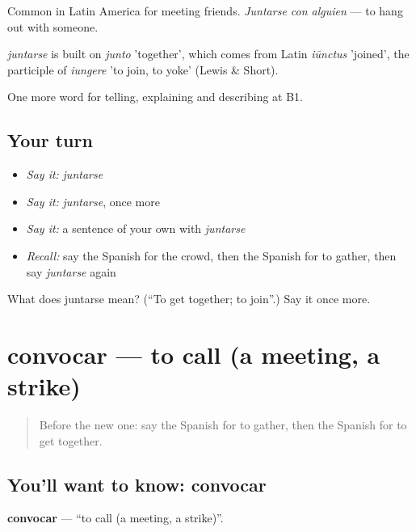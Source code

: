 Common in Latin America for meeting friends. \emph{Juntarse con alguien} — to hang out with someone.

\begin{cousinweb}
\emph{juntarse} is built on \emph{junto} 'together', which comes from Latin \emph{iūnctus} 'joined', the participle of \emph{iungere} 'to join, to yoke' (Lewis \& Short).
\end{cousinweb}

\begin{grammarlens}[title={What you've built}]
One more word for telling, explaining and describing at B1.
\end{grammarlens}

\subsection*{Your turn}
\begin{itemize}
\raggedright
  \item \emph{Say it:} \emph{juntarse}
  \item \emph{Say it:} \emph{juntarse}, once more
  \item \emph{Say it:} a sentence of your own with \emph{juntarse}
  \item \emph{Recall:} say the Spanish for the crowd, then the Spanish for to gather, then say \emph{juntarse} again
\end{itemize}

\begin{tcolorbox}[breakable,colback=teal!4,colframe=teal!35!black,title={Before you move on}]
What does juntarse mean? (\textquotedblleft{}To get together; to join\textquotedblright{}.) Say it once more.
\end{tcolorbox}
\section[convocar]{convocar — to call (a meeting, a strike)}

\label{lesson:ES-C560-convocar}



\begin{quote}
Before the new one: say the Spanish for to gather, then the Spanish for to get together.
\end{quote}

\subsection*{You'll want to know: convocar}
\textbf{convocar} — \textquotedblleft{}to call (a meeting, a strike)\textquotedblright{}.

